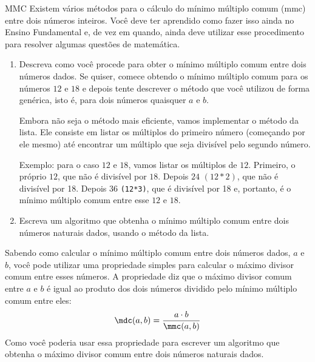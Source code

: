 \begin{task}{MMC}
Existem vários métodos para o cálculo do mínimo múltiplo comum (mmc) entre dois números inteiros. Você deve ter aprendido como fazer isso ainda no Ensino Fundamental e, de vez em quando, ainda deve utilizar esse procedimento para resolver algumas questões de matemática.

\begin{enumerate}
\item Descreva como você procede para obter o mínimo múltiplo comum entre dois números dados. Se quiser, comece obtendo o mínimo múltiplo comum para os números $12$ e $18$ e depois tente descrever o método que você utilizou de forma genérica, isto é, para dois números quaisquer $a$ e $b$.

Embora não seja o método mais eficiente, vamos implementar o método da lista. Ele consiste em listar os múltiplos do primeiro número (começando por ele mesmo) até encontrar um múltiplo que seja divisível pelo segundo número.

Exemplo: para o caso $12$ e $18$, vamos listar os múltiplos de $12$. Primeiro, o próprio $12$, que não é divisível por $18$. Depois $24$ $(12*2)$, que não é divisível por 18. Depois $36$ \verb|(12*3)|, que é divisível por 18 e, portanto, é o mínimo múltiplo comum entre esse $12$ e $18$.

\item Escreva um algoritmo que obtenha o mínimo múltiplo comum entre dois números naturais dados, usando o método da lista.
\end{enumerate}
\end{task}

\begin{reflection}
Sabendo como calcular o mínimo múltiplo comum entre dois números dados, $a$ e $b$, você pode utilizar uma propriedade simples para calcular o máximo divisor comum entre esses números. A propriedade diz que o máximo divisor comum entre $a$ e $b$ é igual ao produto dos dois números dividido pelo mínimo múltiplo comum entre eles:
 \begin{equation*}
\mdc(a,b)=\frac{a\cdot b}{\mmc(a,b)}
\end{equation*}
Como você poderia usar essa propriedade para escrever um algoritmo que obtenha o máximo divisor comum entre dois números naturais dados.
\end{reflection}

